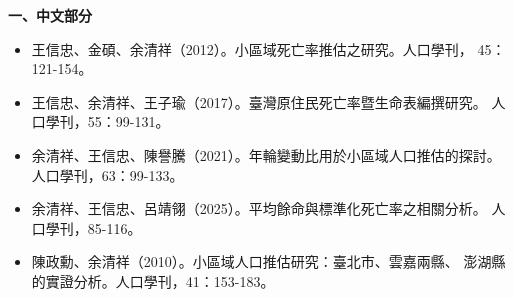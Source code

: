 \documentclass[UTF8, fontset=macnew, a4paper, 12pt]{ctexart}
\begin{document}
\noindent\textbf{一、中文部分}
\begin{itemize}[leftmargin=2em, label={}, itemsep=3pt]
  \item[] 王信忠、金碩、余清祥（2012）。小區域死亡率推估之研究。人口學刊，
        45：121-154。
  \item[] 王信忠、余清祥、王子瑜（2017）。臺灣原住民死亡率暨生命表編撰研究。
        人口學刊，55：99-131。
  \item[] 余清祥、王信忠、陳譽騰（2021）。年輪變動比用於小區域人口推估的探討。
        人口學刊，63：99-133。
  \item[] 余清祥、王信忠、呂靖翎（2025）。平均餘命與標準化死亡率之相關分析。
        人口學刊，85-116。
  \item[] 陳政勳、余清祥（2010）。小區域人口推估研究：臺北市、雲嘉兩縣、
        澎湖縣的實證分析。人口學刊，41：153-183。
\end{itemize}

\renewcommand{\bibsection}{\vspace{8pt}\noindent\textbf{二、英文部分}\par\vspace{4pt}}
\setlength{\bibsep}{2pt}


\end{document}

